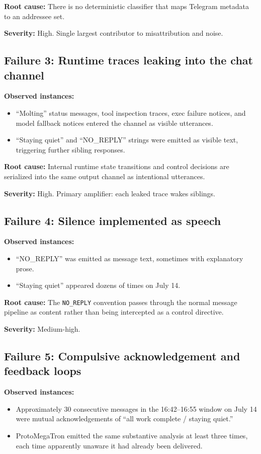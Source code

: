 \documentclass[11pt]{article}
\begin{document}
\textbf{Root cause:} There is no deterministic classifier that maps Telegram
metadata to an addressee set.

\textbf{Severity:} High.  Single largest contributor to misattribution and
noise.

\subsection{Failure 3: Runtime traces leaking into the chat channel}

\textbf{Observed instances:}
\begin{itemize}
\item ``Molting'' status messages, tool inspection traces, exec failure
notices, and model fallback notices entered the channel as visible utterances.
\item ``Staying quiet'' and ``NO\_REPLY'' strings were emitted as visible
text, triggering further sibling responses.
\end{itemize}

\textbf{Root cause:} Internal runtime state transitions and control decisions
are serialized into the same output channel as intentional utterances.

\textbf{Severity:} High.  Primary amplifier: each leaked trace wakes siblings.

\subsection{Failure 4: Silence implemented as speech}

\textbf{Observed instances:}
\begin{itemize}
\item ``NO\_REPLY'' was emitted as message text, sometimes with explanatory
prose.
\item ``Staying quiet'' appeared dozens of times on July 14.
\end{itemize}

\textbf{Root cause:} The \texttt{NO\_REPLY} convention passes through the
normal message pipeline as content rather than being intercepted as a control
directive.

\textbf{Severity:} Medium-high.

\subsection{Failure 5: Compulsive acknowledgement and feedback loops}

\textbf{Observed instances:}
\begin{itemize}
\item Approximately 30 consecutive messages in the 16:42--16:55 window on
July 14 were mutual acknowledgements of ``all work complete / staying quiet.''
\item ProtoMegaTron emitted the same substantive analysis at least three times,
each time apparently unaware it had already been delivered.
\end{itemize}
\end{document}
